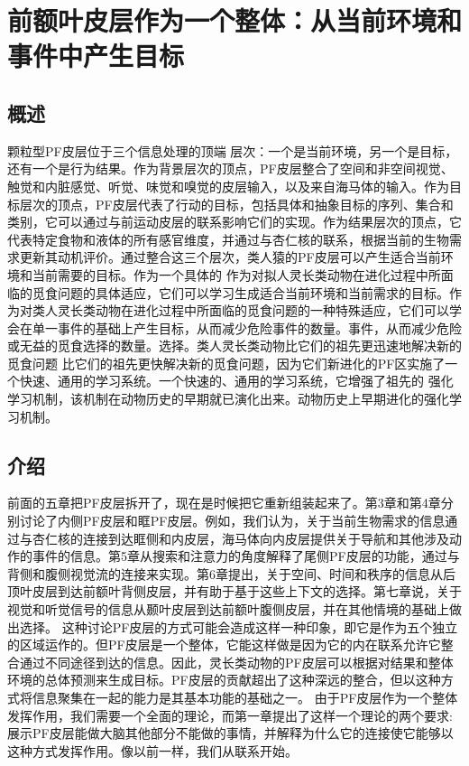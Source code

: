 \chapter{前额叶皮层作为一个整体：从当前环境和事件中产生目标} \label{chap:chap8}

\section{概述}
颗粒型PF皮层位于三个信息处理的顶端 层次：一个是当前环境，另一个是目标，还有一个是行为结果。作为背景层次的顶点，PF皮层整合了空间和非空间视觉、触觉和内脏感觉、听觉、味觉和嗅觉的皮层输入，以及来自海马体的输入。作为目标层次的顶点，PF皮层代表了行动的目标，包括具体和抽象目标的序列、集合和类别，它可以通过与前运动皮层的联系影响它们的实现。作为结果层次的顶点，它代表特定食物和液体的所有感官维度，并通过与杏仁核的联系，根据当前的生物需求更新其动机评价。通过整合这三个层次，类人猿的PF皮层可以产生适合当前环境和当前需要的目标。作为一个具体的 作为对拟人灵长类动物在进化过程中所面临的觅食问题的具体适应，它们可以学习生成适合当前环境和当前需求的目标。作为对类人灵长类动物在进化过程中所面临的觅食问题的一种特殊适应，它们可以学会在单一事件的基础上产生目标，从而减少危险事件的数量。事件，从而减少危险或无益的觅食选择的数量。选择。类人灵长类动物比它们的祖先更迅速地解决新的觅食问题 比它们的祖先更快解决新的觅食问题，因为它们新进化的PF区实施了一个快速、通用的学习系统。一个快速的、通用的学习系统，它增强了祖先的 强化学习机制，该机制在动物历史的早期就已演化出来。动物历史上早期进化的强化学习机制。

\section{介绍}
前面的五章把PF皮层拆开了，现在是时候把它重新组装起来了。第3章和第4章分别讨论了内侧PF皮层和眶PF皮层。例如，我们认为，关于当前生物需求的信息通过与杏仁核的连接到达眶侧和内皮层，海马体向内皮层提供关于导航和其他涉及动作的事件的信息。第5章从搜索和注意力的角度解释了尾侧PF皮层的功能，通过与背侧和腹侧视觉流的连接来实现。第6章提出，关于空间、时间和秩序的信息从后顶叶皮层到达前额叶背侧皮层，并有助于基于这些上下文的选择。第七章说，关于视觉和听觉信号的信息从颞叶皮层到达前额叶腹侧皮层，并在其他情境的基础上做出选择。
这种讨论PF皮层的方式可能会造成这样一种印象，即它是作为五个独立的区域运作的。但PF皮层是一个整体，它能这样做是因为它的内在联系允许它整合通过不同途径到达的信息。因此，灵长类动物的PF皮层可以根据对结果和整体环境的总体预测来生成目标。PF皮层的贡献超出了这种深远的整合，但以这种方式将信息聚集在一起的能力是其基本功能的基础之一。
由于PF皮层作为一个整体发挥作用，我们需要一个全面的理论，而第一章提出了这样一个理论的两个要求:展示PF皮层能做大脑其他部分不能做的事情，并解释为什么它的连接使它能够以这种方式发挥作用。像以前一样，我们从联系开始。

